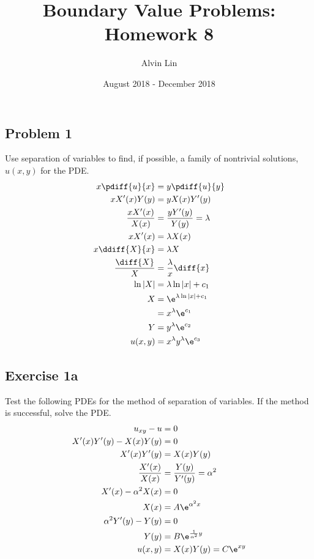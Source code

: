 \documentclass{math}
\title{Boundary Value Problems: Homework 8}
\author{Alvin Lin}
\date{August 2018 - December 2018}
\begin{document}
\maketitle

\subsection*{Problem 1}
Use separation of variables to find, if possible, a family of nontrivial
solutions, \( u(x,y) \) for the PDE.
\begin{align*}
  x\pdiff{u}{x} &= y\pdiff{u}{y} \\
  xX'(x)Y(y) &= yX(x)Y'(y) \\
  \frac{xX'(x)}{X(x)} &= \frac{yY'(y)}{Y(y)} = \lambda \\
  xX'(x) &= \lambda X(x) \\
  x\ddiff{X}{x} &= \lambda X \\
  \frac{\diff{X}}{X} &= \frac{\lambda}{x}\diff{x} \\
  \ln|X| &= \lambda\ln|x|+c_1 \\
  X &= \e^{\lambda\ln|x|+c_1} \\
  &= x^{\lambda}\e^{c_1} \\
  Y &= y^{\lambda}\e^{c_2} \\
  u(x,y) &= x^{\lambda}y^{\lambda}\e^{c_3}
\end{align*}

\subsection*{Exercise 1a}
Test the following PDEs for the method of separation of variables. If the
method is successful, solve the PDE.
\begin{align*}
  u_{xy}-u &= 0 \\
  X'(x)Y'(y)-X(x)Y(y) &= 0 \\
  X'(x)Y'(y) &= X(x)Y(y) \\
  \frac{X'(x)}{X(x)} &= \frac{Y(y)}{Y'(y)} = \alpha^2 \\
  X'(x)-\alpha^2X(x) &= 0 \\
  X(x) &= A\e^{\alpha^2x} \\
  \alpha^2Y'(y)-Y(y) &= 0 \\
  Y(y) &= B\e^{\frac{1}{\alpha^2}y} \\
  u(x,y) &= X(x)Y(y) = C\e^{xy}
\end{align*}
\end{document}
